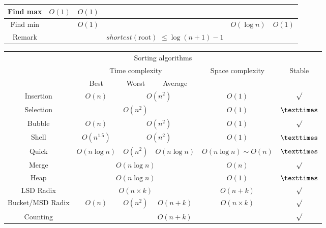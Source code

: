 \begin{enumerate}
\begin{table}[H]
\begin{tabular}{|c|c|c|c|c|c|}
            \hline
            Find max & $O(1)$ & $O(1)$ & & & \\
            \hline
            Find min & & $O(1)$ & & $O(\log n)$ & $O(1)$ \\
            \hline
            Remark & & & \makecell{$shortest(\text{root})$\\$\le \log (n + 1) - 1$} & & \\
            \hline
        \end{tabular}
    \end{table} 
    \begin{table}[H]
        \centering
        \begin{tabular}{|c|c|c|c|c|c|}
            \hline
            \multicolumn{6}{|c|}{Sorting algorithms} \\
            \Xhline{3\arrayrulewidth}
            \multirow{2}{*}{Method} & \multicolumn{3}{c|}{Time complexity} & \multirow{2}{*}{Space complexity} & \multirow{2}{*}{Stable} \\
            \cline{2-4}
            & Best & Worst & Average & & \\
            \Xhline{2\arrayrulewidth}
            Insertion & $O(n)$ & \multicolumn{2}{c|}{$O(n^2)$} & $O(1)$ & $\surd$ \\
            \hline
            Selection & \multicolumn{3}{c|}{$O(n^2)$} & $O(1)$ & $\texttimes$ \\
            \hline
            Bubble & $O(n)$ & \multicolumn{2}{c|}{$O(n^2)$} & $O(1)$ & $\surd$ \\
            \hline
            Shell & $O(n^{1.5})$ & \multicolumn{2}{c|}{$O(n^2)$} & $O(1)$ & $\texttimes$ \\
            \hline
            Quick & $O(n\log n)$ & $O(n^2)$ & $O(n\log n)$ & $O(n\log n) \sim O(n)$ & $\texttimes$ \\
            \hline
            Merge & \multicolumn{3}{c|}{$O(n\log n)$} & $O(n)$ & $\surd$ \\
            \hline
            Heap & \multicolumn{3}{c|}{$O(n\log n)$} & $O(1)$ & $\texttimes$ \\
            \hline
            LSD Radix & \multicolumn{3}{c|}{$O(n \times k)$} & $O(n + k)$ & $\surd$ \\
            \hline
            Bucket/MSD Radix & $O(n)$ & $O(n^2)$ & $O(n + k)$ & $O(n \times k)$ & $\surd$ \\
            \hline
            Counting & \multicolumn{4}{c|}{$O(n + k)$} & $\surd$ \\
            \hline
        \end{tabular}
    \end{table}
\end{enumerate}

\pagebreak